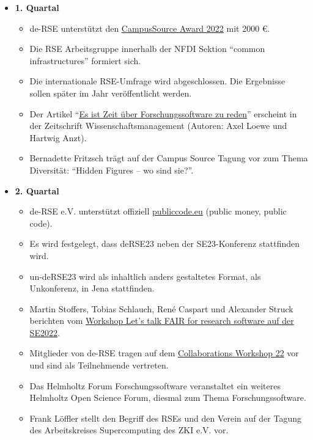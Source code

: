 \begin{itemize}
 \item \textbf{1. Quartal}
   \begin{itemize}
     \item de-RSE unterstützt den \href{https://ev.campussource.de/publikationen/csa2022/}{CampusSource Award 2022} mit 2000 €.
     \item Die RSE Arbeitsgruppe innerhalb der NFDI Sektion "`common infrastructures"' formiert sich.
     \item Die internationale RSE-Umfrage wird abgeschlossen. Die Ergebnisse sollen später im Jahr veröffentlicht werden.
     \item Der Artikel "`\href{https://www.wissenschaftsmanagement.de/news/es-ist-zeit-ueber-forschungssoftware-zu-reden}{Es ist Zeit über Forschungssoftware zu reden}"' erscheint in der Zeitschrift Wissenschaftsmanagement (Autoren: Axel Loewe und Hartwig Anzt).
     \item Bernadette Fritzsch trägt auf der Campus Source Tagung vor zum Thema Diversität: "`Hidden Figures – wo sind sie?"'.

   \end{itemize}
 \item \textbf{2. Quartal}
   \begin{itemize}
    \item de-RSE e.V. unterstützt offiziell \href{https://publiccode.eu}{publiccode.eu} (public money, public code).
    \item Es wird festgelegt, dass deRSE23 neben der SE23-Konferenz stattfinden wird.
    \item un-deRSE23 wird als inhaltlich anders gestaltetes Format, als Unkonferenz, in Jena stattfinden.
    \item Martin Stoffers, Tobias Schlauch, René Caspart und Alexander Struck berichten vom \href{https://de-rse.org/blog/2022/06/02/recap-workshop-lets-talk-fair-for-research-software-at-se2022.html}{Workshop Let's talk FAIR for research software auf der SE2022}.
    \item Mitglieder von de-RSE tragen auf dem \href{https://software.ac.uk/cw22/agenda}{Collaborations Workshop 22} vor und sind als Teilnehmende vertreten.
    \item Das Helmholtz Forum Forschungssoftware veranstaltet ein weiteres Helmholtz Open Science Forum, diesmal zum Thema Forschungssoftware.
    \item Frank Löffler stellt den Begriff des RSEs und den Verein auf der Tagung des Arbeitskreises Supercomputing des ZKI e.V. vor.


\end{itemize}
\end{itemize}
